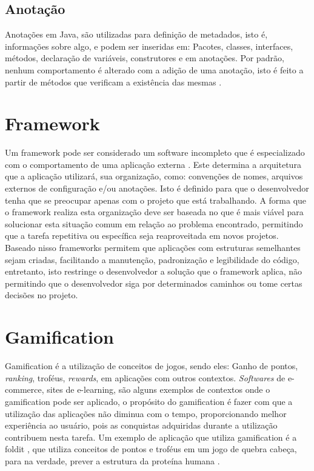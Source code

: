 \subsection{Anotação}

\par Anotações em Java, são utilizadas para definição de metadados, isto é, informações sobre algo, e podem ser inseridas em: Pacotes, classes, interfaces, métodos, declaração de variáveis, construtores e em anotações. Por padrão, nenhum comportamento é alterado com a adição de uma anotação, isto é feito a partir de métodos que verificam a existência das mesmas \cite{bloch2004jsr}.

\section{Framework}

\par Um framework pode ser considerado um software incompleto que é especializado com o comportamento de uma aplicação externa \cite{johnson1988designing}. Este determina a arquitetura que a aplicação utilizará, sua organização, como: convenções de nomes, arquivos externos de configuração e/ou anotações. Isto é definido para que o desenvolvedor tenha que se preocupar apenas com o projeto que está trabalhando. A forma que o framework realiza esta organização deve ser baseada no que é mais viável para solucionar esta situação comum em relação ao problema encontrado, permitindo que a tarefa repetitiva ou específica seja reaproveitada em novos projetos.
Baseado nisso frameworks permitem que aplicações com estruturas semelhantes sejam criadas, facilitando a manutenção, padronização e legibilidade do código, entretanto, isto restringe o desenvolvedor a solução que o framework aplica, não permitindo que o desenvolvedor siga por determinados caminhos ou tome certas decisões no projeto.\cite{gamma2009padroes}

\section{Gamification}

\par Gamification é a utilização de conceitos de jogos, sendo eles: Ganho de pontos, \textit{ranking}, troféus, \textit{rewards}, em aplicações com outros contextos. \textit{Softwares} de e-commerce, sites de e-learning, são alguns exemplos de contextos onde o gamification pode ser aplicado, o propósito do gamification é fazer com que a utilização das aplicações não diminua com o tempo, proporcionando melhor experiência ao usuário, pois as conquistas adquiridas durante a utilização contribuem nesta tarefa. Um exemplo de aplicação que utiliza gamification é a foldit \cite{burke2012behind}, que utiliza conceitos de pontos e troféus em um jogo de quebra cabeça, para na verdade, prever a estrutura da proteína humana \cite{deterding2011gamification}.

